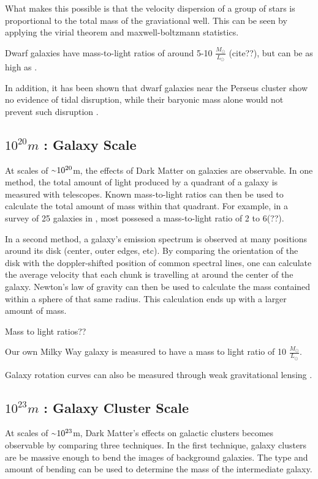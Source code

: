     What makes this possible is that the velocity dispersion of a group of stars is proportional to the total mass of the graviational well.
    This can be seen by applying the virial theorem and maxwell-boltzmann statistics.

    Dwarf galaxies have mass-to-light ratios of around 5-10 $\frac{M_\odot}{L_\odot}$ (cite??), but can be as high as  \cite{Simon2007_dwarfgalaxykeck}.
    
    In addition, it has been shown that dwarf galaxies near the Perseus cluster show no evidence of tidal disruption, while their baryonic mass alone would not prevent such disruption \cite{Penny2009}.

  \subsection{$10^{20}m$ : Galaxy Scale}
    At scales of $\nicetilde 10^{20}$m, the effects of Dark Matter on galaxies are observable.
    In one method, the total amount of light produced by a quadrant of a galaxy is measured with telescopes.
    Known mass-to-light ratios can then be used to calculate the total amount of mass within that quadrant.
    For example, in a survey of 25 galaxies in \cite{galaxy_mass_light_ratio}, most possesed a mass-to-light ratio of 2 to 6(??).


    In a second method, a galaxy's emission spectrum is observed at many positions around its disk (center, outer edges, etc).
    By comparing the orientation of the disk with the doppler-shifted position of common spectral lines, one can calculate the average velocity that each chunk is travelling at around the center of the galaxy.
    Newton's law of gravity can then be used to calculate the mass contained within a sphere of that same radius.
    This calculation ends up with a larger amount of mass.

    Mass to light ratios??

    Our own Milky Way galaxy is measured to have a mass to light ratio of 10 $\frac{M_{\odot}}{L_{\odot}}$.

    Galaxy rotation curves can also be measured through weak gravitational lensing \cite{weak_lensing_2001}.

  \subsection{$10^{23}m$ : Galaxy Cluster Scale}
    At scales of $\nicetilde 10^{23}$m, Dark Matter's effects on galactic clusters becomes observable by comparing three techniques.
    In the first technique, galaxy clusters are be massive enough to bend the images of background galaxies.
    The type and amount of bending can be used to determine the mass of the intermediate galaxy.


